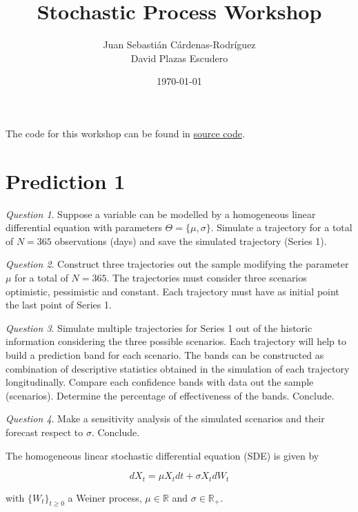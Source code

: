 \documentclass[11pt]{article}
\title{Stochastic Process Workshop}
\author{Juan Sebasti\'an C\'ardenas-Rodríguez \\
       David Plazas Escudero \\
       \scalebox{0.7}{Mathematical Engineering, Universidad EAFIT}}
\date{\today}
\theoremstyle{definition}
\theoremstyle{remark}
\theoremstyle{remark}
\newtheorem{question}{Question}
\newcommand{\R}{{\mathbb{R}}}
\begin{document}
\maketitle

The code for this workshop can be found in
\href{https://bit.ly/3ciL6Px}{source code}.

\section*{Prediction 1}
\begin{question}
  Suppose a variable can be modelled by a homogeneous linear
  differential equation with parameters $\Theta = \{\mu,
  \sigma\}$. Simulate a trajectory for a total of $N = 365$
  observations (days) and save the simulated trajectory (Series 1).
\end{question}

\begin{question}
  Construct three trajectories out the sample modifying the parameter
  $\mu$ for a total of $N = 365$. The trajectories must consider three
  scenarios optimistic, pessimistic and constant. Each trajectory must
  have as initial point the last point of Series 1.
\end{question}

\begin{question}
  Simulate multiple trajectories for Series 1 out of the historic
  information considering the three possible scenarios. Each
  trajectory will help to build a prediction band for each
  scenario. The bands can be constructed as combination of descriptive
  statistics obtained in the simulation of each trajectory
  longitudinally. Compare each confidence bands with data out the
  sample (scenarios). Determine the percentage of effectiveness of the
  bands. Conclude.
\end{question}

\begin{question}
  Make a sensitivity analysis of the simulated scenarios and their
  forecast respect to $\sigma$. Conclude.
\end{question}

The homogeneous linear stochastic differential equation (SDE) is given by

\begin{equation*}
  dX_t = \mu X_t dt + \sigma X_t dW_t
\end{equation*}

with $\{W_t\}_{t \ge 0}$ a Weiner process, $\mu \in \R$ and
$\sigma \in \R_+$.
\end{document}
